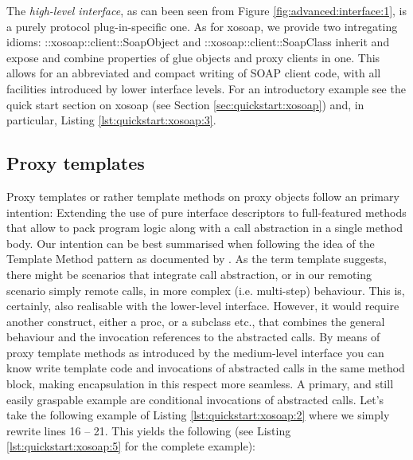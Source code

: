 The \emph{high-level interface}, as can been seen from Figure \ref{fig:advanced:interface:1}, is a purely protocol plug-in-specific one. As for xosoap, we provide two intregating idioms: ::xosoap::client::SoapObject and ::xosoap::client::SoapClass inherit and expose and combine properties of glue objects and proxy clients in one. This allows for an abbreviated and compact writing of SOAP client code, with all facilities introduced by lower interface levels. For an introductory example see the quick start section on xosoap (see Section \ref{sec:quickstart:xosoap}) and, in particular, Listing \ref{lst:quickstart:xosoap:3}.

 \subsection{Proxy templates}\label{sec:advanced:template}
Proxy templates or rather template methods on proxy objects follow an primary intention: Extending the use of pure interface descriptors to full-featured methods that allow to pack program logic along with a call abstraction in a single method body. Our intention can be best summarised when following the idea of the Template Method pattern as documented by \cite{gof:1994}. As the term template suggests, there might be scenarios that integrate call abstraction, or in our remoting scenario simply remote calls, in more complex (i.e. multi-step) behaviour. This is, certainly, also realisable with the lower-level interface. However, it would require another construct, either a proc, or a subclass etc., that combines the general behaviour and the invocation references to the abstracted calls. By means of proxy template methods as introduced by the medium-level interface you can know write template code and invocations of abstracted calls in the same method block, making encapsulation in this respect more seamless. A primary, and still easily graspable example are conditional invocations of abstracted calls. Let's take the following example of Listing \ref{lst:quickstart:xosoap:2} where we simply rewrite lines 16 -- 21. This yields the following (see Listing \ref{lst:quickstart:xosoap:5} for the complete example): 



